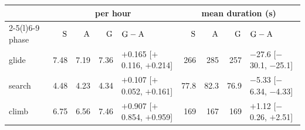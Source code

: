 \begin{tabular}{@{}l r r r l r r r l@{}}
\toprule
 & \multicolumn{4}{c}{per hour} & \multicolumn{4}{c}{mean duration (s)} \\
\cmidrule(lr){2-5}\cmidrule(l){6-9}
phase & $\mathrm{S}$ & $\mathrm{A}$ & $\mathrm{G}$ & $\mathrm{G}-\mathrm{A}$ & $\mathrm{S}$ & $\mathrm{A}$ & $\mathrm{G}$ & $\mathrm{G}-\mathrm{A}$ \\
\midrule
glide & 7.48 & 7.19 & 7.36 & $+$0.165 [$+$0.116, $+$0.214] & 266 & 285 & 257 & $-$27.6 [$-$30.1, $-$25.1] \\
search & 4.48 & 4.23 & 4.34 & $+$0.107 [$+$0.052, $+$0.161] & 77.8 & 82.3 & 76.9 & $-$5.33 [$-$6.34, $-$4.33] \\
climb & 6.75 & 6.56 & 7.46 & $+$0.907 [$+$0.854, $+$0.959] & 169 & 167 & 169 & $+$1.12 [$-$0.26, $+$2.51] \\
\bottomrule
\end{tabular}
